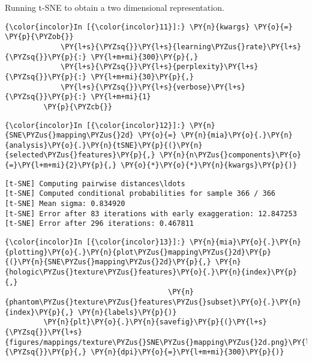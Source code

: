 Running t-SNE to obtain a two dimensional representation.

    \begin{Verbatim}[commandchars=\\\{\}]
{\color{incolor}In [{\color{incolor}11}]:} \PY{n}{kwargs} \PY{o}{=} \PY{p}{\PYZob{}}
             \PY{l+s}{\PYZsq{}}\PY{l+s}{learning\PYZus{}rate}\PY{l+s}{\PYZsq{}}\PY{p}{:} \PY{l+m+mi}{300}\PY{p}{,}
             \PY{l+s}{\PYZsq{}}\PY{l+s}{perplexity}\PY{l+s}{\PYZsq{}}\PY{p}{:} \PY{l+m+mi}{30}\PY{p}{,}
             \PY{l+s}{\PYZsq{}}\PY{l+s}{verbose}\PY{l+s}{\PYZsq{}}\PY{p}{:} \PY{l+m+mi}{1}
         \PY{p}{\PYZcb{}}
\end{Verbatim}

    \begin{Verbatim}[commandchars=\\\{\}]
{\color{incolor}In [{\color{incolor}12}]:} \PY{n}{SNE\PYZus{}mapping\PYZus{}2d} \PY{o}{=} \PY{n}{mia}\PY{o}{.}\PY{n}{analysis}\PY{o}{.}\PY{n}{tSNE}\PY{p}{(}\PY{n}{selected\PYZus{}features}\PY{p}{,} \PY{n}{n\PYZus{}components}\PY{o}{=}\PY{l+m+mi}{2}\PY{p}{,} \PY{o}{*}\PY{o}{*}\PY{n}{kwargs}\PY{p}{)}
\end{Verbatim}

    \begin{Verbatim}[commandchars=\\\{\}]
[t-SNE] Computing pairwise distances\ldots
[t-SNE] Computed conditional probabilities for sample 366 / 366
[t-SNE] Mean sigma: 0.834920
[t-SNE] Error after 83 iterations with early exaggeration: 12.847253
[t-SNE] Error after 296 iterations: 0.467811
    \end{Verbatim}

    \begin{Verbatim}[commandchars=\\\{\}]
{\color{incolor}In [{\color{incolor}13}]:} \PY{n}{mia}\PY{o}{.}\PY{n}{plotting}\PY{o}{.}\PY{n}{plot\PYZus{}mapping\PYZus{}2d}\PY{p}{(}\PY{n}{SNE\PYZus{}mapping\PYZus{}2d}\PY{p}{,} \PY{n}{hologic\PYZus{}texture\PYZus{}features}\PY{o}{.}\PY{n}{index}\PY{p}{,}
                                      \PY{n}{phantom\PYZus{}texture\PYZus{}features\PYZus{}subset}\PY{o}{.}\PY{n}{index}\PY{p}{,} \PY{n}{labels}\PY{p}{)}
         \PY{n}{plt}\PY{o}{.}\PY{n}{savefig}\PY{p}{(}\PY{l+s}{\PYZsq{}}\PY{l+s}{figures/mappings/texture\PYZus{}SNE\PYZus{}mapping\PYZus{}2d.png}\PY{l+s}{\PYZsq{}}\PY{p}{,} \PY{n}{dpi}\PY{o}{=}\PY{l+m+mi}{300}\PY{p}{)}
\end{Verbatim}

    \begin{center}
    \end{center}
    { \hspace*{\fill} \\}

